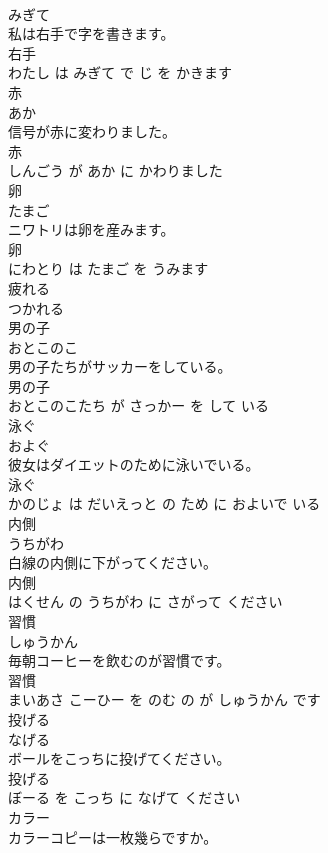 \documentclass[8pt]{extreport}
\begin{document}
\begin{CJK}{UTF8}{min}
\\	みぎて			
\\	私は右手で字を書きます。	
\\	右手 
\\	わたし は みぎて で じ を かきます			
\\	赤	
\\	あか			
\\	信号が赤に変わりました。	
\\	赤 
\\	しんごう が あか に かわりました			
\\	卵	
\\	たまご			
\\	ニワトリは卵を産みます。	
\\	卵 
\\	にわとり は たまご を うみます			
\\	疲れる	
\\	つかれる			
\\	男の子	
\\	おとこのこ			
\\	男の子たちがサッカーをしている。	
\\	男の子 
\\	おとこのこたち が さっかー を して いる			
\\	泳ぐ	
\\	およぐ			
\\	彼女はダイエットのために泳いでいる。	
\\	泳ぐ 
\\	かのじょ は だいえっと の ため に およいで いる			
\\	内側	
\\	うちがわ			
\\	白線の内側に下がってください。	
\\	内側 
\\	はくせん の うちがわ に さがって ください			
\\	習慣	
\\	しゅうかん			
\\	毎朝コーヒーを飲むのが習慣です。	
\\	習慣 
\\	まいあさ こーひー を のむ の が しゅうかん です			
\\	投げる	
\\	なげる			
\\	ボールをこっちに投げてください。	
\\	投げる 
\\	ぼーる を こっち に なげて ください			
\\	カラー	
\\	カラーコピーは一枚幾らですか。	

\end{CJK}
\end{document}
